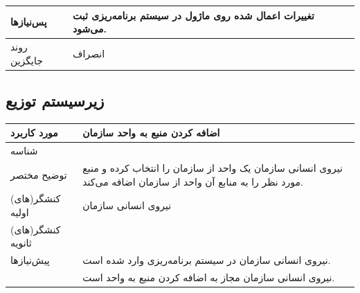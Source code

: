 \begin{table}[H]
\begin{tabular}{|p{3cm}|p{10cm}|}
		\hline
		
		پس‌نیازها &
		تغییرات اعمال شده روی ماژول در سیستم برنامه‌ریزی ثبت می‌شود. \\
		
		\hline
		
		روند جایگزین
		& انصراف \\
		\hline
		
	\end{tabular}
\end{table}

\subsection{زیرسیستم توزیع}

\begin{table}[H]
	\centering
	\begin{tabular}{|p{3cm}|p{10cm}|}
		\hline
		
		مورد کاربرد	& اضافه کردن منبع به واحد سازمان  \\
		\hline
		
		شناسه & 
		\stepcounter{usecase_ID}
		
		\arabic{usecase_ID} \\
		
		\hline
		
		توضیح مختصر & نیروی انسانی سازمان یک واحد از سازمان را انتخاب کرده و منبع مورد نظر را به منابع آن واحد از سازمان اضافه می‌کند. \\
		\hline
		
		کنشگر(های) اولیه& نیروی انسانی سازمان \\
		\hline
		
		کنشگر(های) ثانویه&  \\
		\hline
		
		پیش‌نیازها &
		نیروی انسانی سازمان در سیستم برنامه‌ریزی وارد شده است.\\
		& نیروی انسانی سازمان مجاز به اضافه کردن منبع به واحد است. \\
		\hline
		

\end{tabular}
\end{table}
